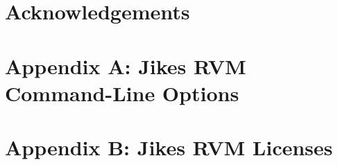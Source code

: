 \documentclass{article}
\begin{document}
\T \newpage
\section*{Acknowledgements}


\T \newpage
\T 
\T 

\T \newpage

\T \appendix

\section{Appendix A: Jikes RVM Command-Line Options}
\label{appendix:nonadaptive:cmdline}


\section{Appendix B: Jikes RVM Licenses}
\label{appendix:licenses}


\W \section*{\indexname}\label{hlxindex}
\W \htmlprintindex
\T \printindex
\end{document}
